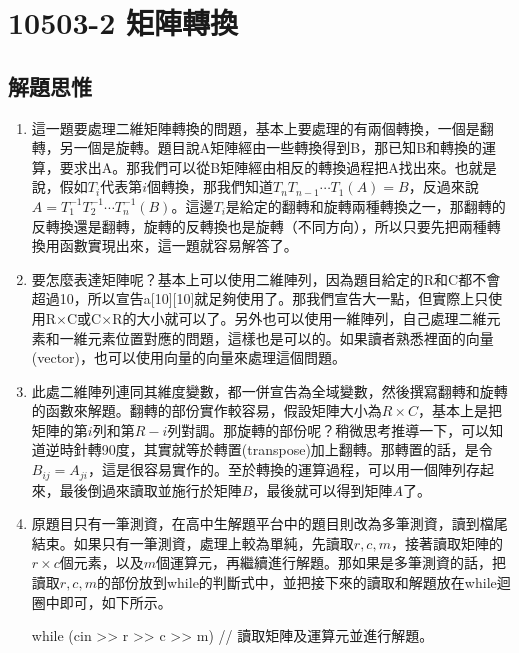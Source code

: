 \section{10503-2 矩陣轉換}

\subsection{解題思惟}
\begin{enumerate}
	\item 這一題要處理二維矩陣轉換的問題，基本上要處理的有兩個轉換，一個是翻轉，另一個是旋轉。題目說A矩陣經由一些轉換得到B，那已知B和轉換的運算，要求出A。那我們可以從B矩陣經由相反的轉換過程把A找出來。也就是說，假如$T_i$代表第$i$個轉換，那我們知道$T_nT_{n-1}\cdots T_1(A)=B$，反過來說$A=T_1^{-1}T_2^{-1}\cdots T_n^{-1}(B)$。這邊$T_i$是給定的翻轉和旋轉兩種轉換之一，那翻轉的反轉換還是翻轉，旋轉的反轉換也是旋轉（不同方向），所以只要先把兩種轉換用函數實現出來，這一題就容易解答了。
	\item 要怎麼表達矩陣呢？基本上可以使用二維陣列，因為題目給定的R和C都不會超過10，所以宣告a[10][10]就足夠使用了。那我們宣告大一點，但實際上只使用R$\times$C或C$\times$R的大小就可以了。另外也可以使用一維陣列，自己處理二維元素和一維元素位置對應的問題，這樣也是可以的。如果讀者熟悉\cc{}裡面的向量(vector)，也可以使用向量的向量來處理這個問題。
	\item 此處二維陣列連同其維度變數，都一併宣告為全域變數，然後撰寫翻轉和旋轉的函數來解題。翻轉的部份實作較容易，假設矩陣大小為$R\times C$，基本上是把矩陣的第$i$列和第$R-i$列對調。那旋轉的部份呢？稍微思考推導一下，可以知道逆時針轉90度，其實就等於轉置(transpose)加上翻轉。那轉置的話，是令$B_{ij}=A_{ji}$，這是很容易實作的。至於轉換的運算過程，可以用一個陣列存起來，最後倒過來讀取並施行於矩陣$B$，最後就可以得到矩陣$A$了。
	\item 原題目只有一筆測資，在高中生解題平台中的題目則改為多筆測資，讀到檔尾結束。如果只有一筆測資，處理上較為單純，先讀取$r, c, m$，接著讀取矩陣的$r\times c$個元素，以及$m$個運算元，再繼續進行解題。那如果是多筆測資的話，把讀取$r, c, m$的部份放到while的判斷式中，並把接下來的讀取和解題放在while迴圈中即可，如下所示。
	\begin{inside}
		while (cin >> r >> c >> m) {
			// 讀取矩陣及運算元並進行解題。
		}
	\end{inside}		
\end{enumerate}

